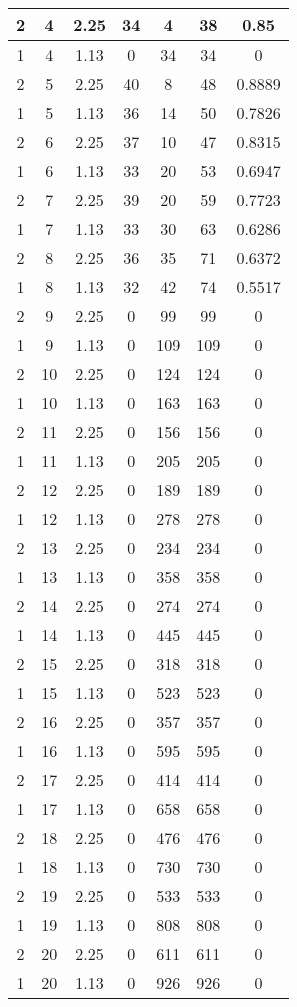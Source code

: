 \documentclass[letterpaper, 12pt]{article}
\begin{document}
\begin{longtable}{|c|c|c|c|c|c|c|}
\hline
2 & 4 & 2.25 & 34 & 4 & 38 & 0.85 \\
\hline
1 & 4 & 1.13 & 0 & 34 & 34 & 0 \\
\hline
2 & 5 & 2.25 & 40 & 8 & 48 & 0.8889 \\
\hline
1 & 5 & 1.13 & 36 & 14 & 50 & 0.7826 \\
\hline
2 & 6 & 2.25 & 37 & 10 & 47 & 0.8315 \\
\hline
1 & 6 & 1.13 & 33 & 20 & 53 & 0.6947 \\
\hline
2 & 7 & 2.25 & 39 & 20 & 59 & 0.7723 \\
\hline
1 & 7 & 1.13 & 33 & 30 & 63 & 0.6286 \\
\hline
2 & 8 & 2.25 & 36 & 35 & 71 & 0.6372 \\
\hline
1 & 8 & 1.13 & 32 & 42 & 74 & 0.5517 \\
\hline
2 & 9 & 2.25 & 0 & 99 & 99 & 0 \\
\hline
1 & 9 & 1.13 & 0 & 109 & 109 & 0 \\
\hline
2 & 10 & 2.25 & 0 & 124 & 124 & 0 \\
\hline
1 & 10 & 1.13 & 0 & 163 & 163 & 0 \\
\hline
2 & 11 & 2.25 & 0 & 156 & 156 & 0 \\
\hline
1 & 11 & 1.13 & 0 & 205 & 205 & 0 \\
\hline
2 & 12 & 2.25 & 0 & 189 & 189 & 0 \\
\hline
1 & 12 & 1.13 & 0 & 278 & 278 & 0 \\
\hline
2 & 13 & 2.25 & 0 & 234 & 234 & 0 \\
\hline
1 & 13 & 1.13 & 0 & 358 & 358 & 0 \\
\hline
2 & 14 & 2.25 & 0 & 274 & 274 & 0 \\
\hline
1 & 14 & 1.13 & 0 & 445 & 445 & 0 \\
\hline
2 & 15 & 2.25 & 0 & 318 & 318 & 0 \\
\hline
1 & 15 & 1.13 & 0 & 523 & 523 & 0 \\
\hline
2 & 16 & 2.25 & 0 & 357 & 357 & 0 \\
\hline
1 & 16 & 1.13 & 0 & 595 & 595 & 0 \\
\hline
2 & 17 & 2.25 & 0 & 414 & 414 & 0 \\
\hline
1 & 17 & 1.13 & 0 & 658 & 658 & 0 \\
\hline
2 & 18 & 2.25 & 0 & 476 & 476 & 0 \\
\hline
1 & 18 & 1.13 & 0 & 730 & 730 & 0 \\
\hline
2 & 19 & 2.25 & 0 & 533 & 533 & 0 \\
\hline
1 & 19 & 1.13 & 0 & 808 & 808 & 0 \\
\hline
2 & 20 & 2.25 & 0 & 611 & 611 & 0 \\
\hline
1 & 20 & 1.13 & 0 & 926 & 926 & 0 \\
\hline
\end{longtable}
\end{document}
